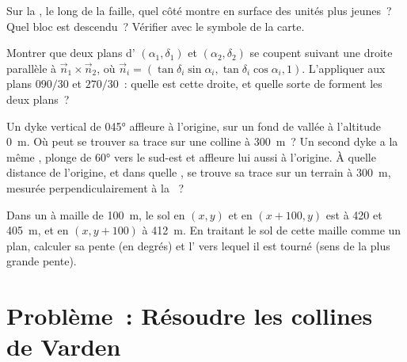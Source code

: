 \begin{exercise}[$\star\star$]\label{exo:b1:geological-maps:9}
Sur la , le long de la faille, quel côté montre en surface des
unités plus jeunes~? Quel bloc est descendu~? Vérifier avec le symbole de la carte.
\end{exercise}

\begin{exercise}[$\star\star\star$]\label{exo:b1:geological-maps:10}
Montrer que deux plans d' $(\alpha_1, \delta_1)$ et
$(\alpha_2, \delta_2)$ se coupent suivant une droite parallèle à
$\vec n_1 \times \vec n_2$, où $\vec n_i = (\tan\delta_i\sin\alpha_i,
\tan\delta_i\cos\alpha_i, 1)$. L'appliquer aux plans $090/30$ et $270/30$~:
quelle est cette droite, et quelle sorte de  forment les deux plans~?
\end{exercise}

\begin{exercise}[$\star\star\star$]\label{exo:b1:geological-maps:11}
Un dyke vertical de  \ang{045} affleure à l'origine, sur un fond de
vallée à l'altitude \qty{0}{m}. Où peut se trouver sa trace sur une colline à
\qty{300}{m}~? Un second dyke a la même , plonge de \ang{60} vers le
sud-est et affleure lui aussi à l'origine. À quelle distance de l'origine, et
dans quelle , se trouve sa trace sur un terrain à \qty{300}{m},
mesurée perpendiculairement à la ~?
\end{exercise}

\begin{exercise}[$\star\star\star$]\label{exo:b1:geological-maps:12}
Dans un  à maille de \qty{100}{m}, le sol en
$(x, y)$ et en $(x + 100, y)$ est à 420 et \qty{405}{m}, et en
$(x, y + 100)$ à \qty{412}{m}. En traitant le sol de cette maille comme un plan,
calculer sa pente (en degrés) et l' vers lequel il est tourné (sens de la
plus grande pente).
\end{exercise}

\section{Problème~: Résoudre les collines de Varden}

